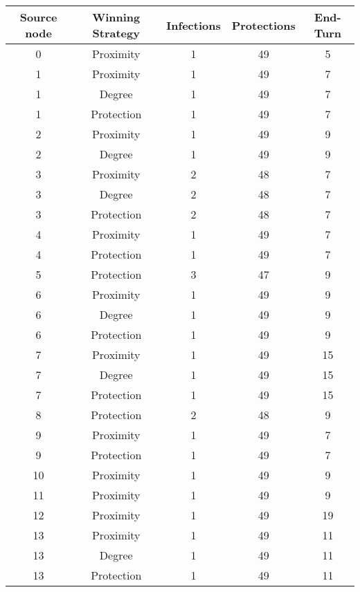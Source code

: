 \documentclass[results.tex]{subfiles}
\begin{document}
\begin{center}
  \begin{tabular}{| c || c | c | c | c |}
    \hline
    {\bfseries Source node} & {\bfseries Winning Strategy} & {\bfseries Infections} & {\bfseries Protections} & {\bfseries End-Turn} \\  %
    \hline\hline
    0 & Proximity & 1 & 49 & 5 \\ 
    \hline
    1 & Proximity & 1 & 49 & 7 \\ 
    \hline
    1 & Degree & 1 & 49 & 7 \\ 
    \hline
    1 & Protection & 1 & 49 & 7 \\ 
    \hline
    2 & Proximity & 1 & 49 & 9 \\ 
    \hline
    2 & Degree & 1 & 49 & 9 \\ 
    \hline
    3 & Proximity & 2 & 48 & 7 \\ 
    \hline
    3 & Degree & 2 & 48 & 7 \\ 
    \hline
    3 & Protection & 2 & 48 & 7 \\ 
    \hline
    4 & Proximity & 1 & 49 & 7 \\ 
    \hline
    4 & Protection & 1 & 49 & 7 \\ 
    \hline
    5 & Protection & 3 & 47 & 9 \\ 
    \hline
    6 & Proximity & 1 & 49 & 9 \\ 
    \hline
    6 & Degree & 1 & 49 & 9 \\ 
    \hline
    6 & Protection & 1 & 49 & 9 \\ 
    \hline
    7 & Proximity & 1 & 49 & 15 \\ 
    \hline
    7 & Degree & 1 & 49 & 15 \\ 
    \hline
    7 & Protection & 1 & 49 & 15 \\ 
    \hline
    8 & Protection & 2 & 48 & 9 \\ 
    \hline
    9 & Proximity & 1 & 49 & 7 \\ 
    \hline
    9 & Protection & 1 & 49 & 7 \\ 
    \hline
    10 & Proximity & 1 & 49 & 9 \\ 
    \hline
    11 & Proximity & 1 & 49 & 9 \\ 
    \hline
    12 & Proximity & 1 & 49 & 19 \\ 
    \hline
    13 & Proximity & 1 & 49 & 11 \\ 
    \hline
    13 & Degree & 1 & 49 & 11 \\ 
    \hline
    13 & Protection & 1 & 49 & 11 \\ 

\end{tabular}
\end{center}
\end{document}
